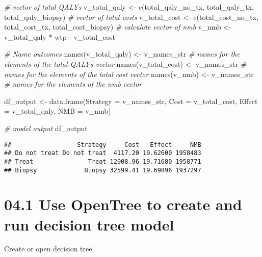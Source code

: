 \documentclass[
]{article}
\newenvironment{Shaded}{\begin{snugshade}}{\end{snugshade}}
\newcommand{\AttributeTok}[1]{\textcolor[rgb]{0.77,0.63,0.00}{#1}}
\newcommand{\CommentTok}[1]{\textcolor[rgb]{0.56,0.35,0.01}{\textit{#1}}}
\newcommand{\FunctionTok}[1]{\textcolor[rgb]{0.00,0.00,0.00}{#1}}
\newcommand{\NormalTok}[1]{#1}
\newcommand{\OtherTok}[1]{\textcolor[rgb]{0.56,0.35,0.01}{#1}}
\newcommand{\SpecialCharTok}[1]{\textcolor[rgb]{0.00,0.00,0.00}{#1}}
\begin{document}
\begin{Shaded}
\begin{Highlighting}[]
\CommentTok{\# vector of total QALYs}
\NormalTok{v\_total\_qaly }\OtherTok{\textless{}{-}} \FunctionTok{c}\NormalTok{(total\_qaly\_no\_tx, total\_qaly\_tx, total\_qaly\_biopsy) }
\CommentTok{\# vector of total costs}
\NormalTok{v\_total\_cost }\OtherTok{\textless{}{-}} \FunctionTok{c}\NormalTok{(total\_cost\_no\_tx, total\_cost\_tx, total\_cost\_biopsy) }
\CommentTok{\# calculate vector of nmb}
\NormalTok{v\_nmb        }\OtherTok{\textless{}{-}}\NormalTok{ v\_total\_qaly }\SpecialCharTok{*}\NormalTok{ wtp }\SpecialCharTok{{-}}\NormalTok{ v\_total\_cost                      }
  
\CommentTok{\# Name outcomes}
\FunctionTok{names}\NormalTok{(v\_total\_qaly) }\OtherTok{\textless{}{-}}\NormalTok{ v\_names\_str  }\CommentTok{\# names for the elements of the total QALYs vector}
\FunctionTok{names}\NormalTok{(v\_total\_cost) }\OtherTok{\textless{}{-}}\NormalTok{ v\_names\_str  }\CommentTok{\# names for the elements of the total cost vector}
\FunctionTok{names}\NormalTok{(v\_nmb)        }\OtherTok{\textless{}{-}}\NormalTok{ v\_names\_str  }\CommentTok{\# names for the elements of the nmb vector}

\NormalTok{df\_output }\OtherTok{\textless{}{-}} \FunctionTok{data.frame}\NormalTok{(}\AttributeTok{Strategy =}\NormalTok{  v\_names\_str,}
                        \AttributeTok{Cost     =}\NormalTok{  v\_total\_cost,}
                        \AttributeTok{Effect   =}\NormalTok{  v\_total\_qaly,}
                        \AttributeTok{NMB      =}\NormalTok{  v\_nmb)}

\CommentTok{\# model output}
\NormalTok{df\_output}
\end{Highlighting}
\end{Shaded}

\begin{verbatim}
##                  Strategy     Cost   Effect     NMB
## Do not treat Do not treat  4117.20 19.62600 1958483
## Treat               Treat 12908.96 19.71680 1958771
## Biopsy             Biopsy 32599.41 19.69896 1937297
\end{verbatim}

\hypertarget{use-opentree-to-create-and-run-decision-tree-model}{%
\section{04.1 Use OpenTree to create and run decision tree
model}\label{use-opentree-to-create-and-run-decision-tree-model}}

Create or open decision tree.
\end{document}
